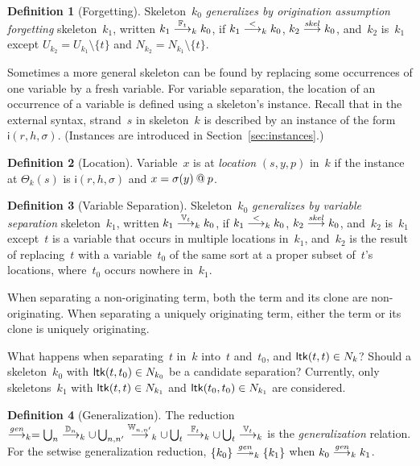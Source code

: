 \documentclass[12pt]{report}
\theoremstyle{definition}
\newtheorem{defn}{Definition}[chapter]
\newenvironment{note}{\itshape\par}{}
\newcommand{\inst}{\mathsf{i}}
\begin{document}
\begin{defn}[Forgetting]
Skeleton~$k_0$ \emph{generalizes by origination
  assumption forgetting} skeleton~$k_1$, written
$k_1\stackrel{\mathbb F_t}{\longrightarrow}_k k_0$, if $k_1\stackrel{<}{\longrightarrow}_k k_0$,
$k_2\stackrel{\operatorname{\mathit{skel}}}{\longrightarrow}k_0$, and~$k_2$ is~$k_1$ except
$U_{k_2}=U_{k_1}\setminus\{t\}$ and $N_{k_2}=N_{k_1}\setminus\{t\}$.
\end{defn}

Sometimes a more general skeleton can be found by replacing some
occurrences of one variable by a fresh variable.  For variable
separation, the location of an occurrence of a variable is defined
using a skeleton's instance.  Recall that in the external syntax,
strand~$s$ in skeleton~$k$ is described by an instance of the form
$\inst(r,h,\sigma)$.  (Instances are introduced in
Section~\ref{sec:instances}.)

\begin{defn}[Location]
Variable~$x$ is at \emph{location} $(s,y,p)$ in~$k$ if
the instance at $\Theta_k(s)$ is $\inst(r,h,\sigma)$ and
$x=\sigma(y)\mathbin{@} p$.
\end{defn}

\begin{defn}[Variable Separation]
Skeleton~$k_0$ \emph{generalizes by
  variable separation} skeleton~$k_1$, written
$k_1\stackrel{\mathbb V_t}{\longrightarrow}_k k_0$, if $k_1\stackrel{<}{\longrightarrow}_k k_0$,
$k_2\stackrel{\operatorname{\mathit{skel}}}{\longrightarrow}k_0$, and~$k_2$ is~$k_1$ except~$t$ is a
variable that occurs in multiple locations in~$k_1$, and~$k_2$ is the
result of replacing~$t$ with a variable~$t_0$ of the same sort at a
proper subset of~$t$'s locations, where~$t_0$ occurs nowhere in~$k_1$.
\end{defn}

When separating a non-originating term, both the term and its clone
are non-originating.  When separating a uniquely originating term,
either the term or its clone is uniquely originating.

\begin{note}
What happens when separating~$t$ in~$k$ into~$t$ and~$t_0$, and
$\operatorname{\mathsf{ltk}}(t,t)\in N_k$?  Should a skeleton~$k_0$ with
$\operatorname{\mathsf{ltk}}(t,t_0)\in N_{k_0}$ be a candidate separation?
Currently, only skeletons~$k_1$ with $\operatorname{\mathsf{ltk}}(t,t)\in N_{k_1}$
and $\operatorname{\mathsf{ltk}}(t_0,t_0)\in N_{k_1}$ are considered.
\end{note}

\begin{defn}[Generalization]
The reduction~$\stackrel{\operatorname{\mathit{gen}}}{\longrightarrow}_k
=\bigcup_n\stackrel{\mathbb D_n}{\longrightarrow}_k\cup
\bigcup_{n,n'}\stackrel{\mathbb W_{n,n'}}{\longrightarrow}_k\cup
\bigcup_t\stackrel{\mathbb F_t}{\longrightarrow}_k\cup \bigcup_t\stackrel{\mathbb V_t}{\longrightarrow}_k$
is the \emph{generalization} relation.  For the setwise generalization
reduction, $\{k_0\}\setreduction{\fn{gen}}_k\{k_1\}$ when
$k_0\stackrel{\operatorname{\mathit{gen}}}{\longrightarrow}_k k_1$.
\end{defn}
\end{document}
